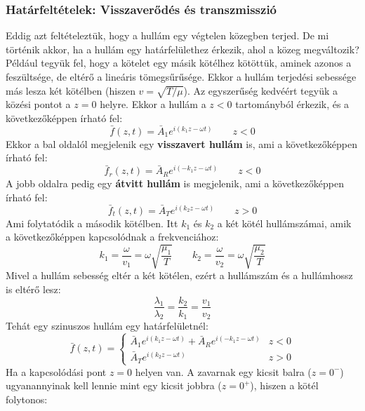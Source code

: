 \documentclass[a4paper,12pt]{article}
\begin{document}
\subsubsection{Határfeltételek: Visszaverődés és transzmisszió}
Eddig azt feltételeztük, hogy a hullám egy végtelen közegben terjed. De mi történik akkor, ha a hullám egy határfelülethez érkezik, ahol a közeg megváltozik?
Például tegyük fel, hogy a kötelet egy másik kötélhez kötöttük, aminek azonos a feszültsége, de eltérő a lineáris tömegsűrűsége. Ekkor a hullám terjedési sebessége más lesza két kötélben (hiszen $v = \sqrt{T/\mu}$).
Az egyszerűség kedvéért tegyük a közési pontot a $z=0$ helyre. Ekkor a hullám a $z<0$ tartományból érkezik, és a következőképpen írható fel:
\begin{equation}
    \bar{f}(z, t) = \bar{A}_1 e^{i(k_1 z - \omega t)} \qquad z < 0
\end{equation}
Ekkor a bal oldalól megjelenik egy \textbf{visszavert hullám} is, ami a következőképpen írható fel:
\begin{equation}
    \bar{f}_r(z, t) = \bar{A}_R e^{i(-k_1 z - \omega t)} \qquad z < 0
\end{equation}
A jobb oldalra pedig egy \textbf{átvitt hullám} is megjelenik, ami a következőképpen írható fel:
\begin{equation}
    \bar{f}_t(z, t) = \bar{A}_T e^{i(k_2 z - \omega t)} \qquad z > 0
\end{equation}
Ami folytatódik a második kötélben. Itt $k_1$ és $k_2$ a két kötél hullámszámai, amik a következőképpen kapcsolódnak a frekvenciához:
\begin{equation}
    k_1 = \frac{\omega}{v_1} = \omega \sqrt{\frac{\mu_1}{T}} \qquad k_2 = \frac{\omega}{v_2} = \omega \sqrt{\frac{\mu_2}{T}}
\end{equation}
Mivel a hullám sebesség eltér a két kötélen, ezért a hullámszám és a hullámhossz is eltérő lesz:
\begin{equation}
    \frac{\lambda_1}{\lambda_2} = \frac{k_2}{k_1} = \frac{v_1}{v_2}
\end{equation}
Tehát egy szinuszos hullám egy határfelületnél:
\begin{equation}
    \bar{f}(z, t) = \begin{cases}
        \bar{A}_1 e^{i(k_1 z - \omega t)} + \bar{A}_R e^{i(-k_1 z - \omega t)} & z < 0 \\
        \bar{A}_T e^{i(k_2 z - \omega t)} & z > 0
    \end{cases}
\end{equation}
Ha a kapcsolódási pont $z=0$ helyen van. A zavarnak egy kicsit balra ($z = 0^-$) ugyanannyinak kell lennie mint egy kicsit jobbra ($z = 0^+$), hiszen a kötél folytonos:
\end{document}
